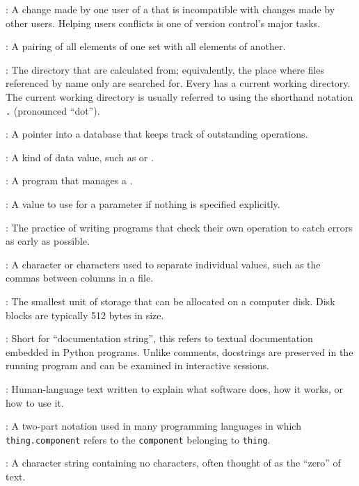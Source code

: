 :
A change made by one user of a
 that is
incompatible with changes made by other users. Helping users
 conflicts is one of version control's
major tasks.

:
A pairing of all elements of one set with all
elements of another.

:
The directory that
 are calculated from;
equivalently, the place where files referenced by name only are searched
for. Every  has a current working
directory. The current working directory is usually referred to using
the shorthand notation \texttt{.} (pronounced ``dot'').

:
A pointer into a database that keeps track of
outstanding operations.

:
A kind of data value, such as
 or .

:
A program that manages a
.

:
A value to use for a parameter if
nothing is specified explicitly.

:
The practice of writing programs that
check their own operation to catch errors as early as possible.

:
A character or characters used to separate
individual values, such as the commas between columns in a
 file.

:
The smallest unit of storage that can be allocated
on a computer disk. Disk blocks are typically 512 bytes in size.

:
Short for ``documentation string'', this refers to
textual documentation embedded in Python programs. Unlike comments,
docstrings are preserved in the running program and can be examined in
interactive sessions.

:
Human-language text written to explain what
software does, how it works, or how to use it.

:
A two-part notation used in many programming
languages in which \texttt{thing.component} refers to the
\texttt{component} belonging to \texttt{thing}.

:
A character string containing no characters,
often thought of as the ``zero'' of text.


